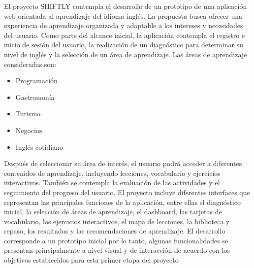 El proyecto SHIFTLY contempla el desarrollo de un prototipo de una
aplicación web orientada al aprendizaje del idioma inglés. La propuesta
busca ofrecer una experiencia de aprendizaje organizada y adaptable a los
intereses y necesidades del usuario. Como parte del alcance inicial, la aplicación contempla el registro e inicio de sesión del usuario, la realización de un diagnóstico para determinar su nivel de inglés y la selección de un área de aprendizaje.
Las áreas de aprendizaje consideradas son:
\begin{itemize}
\item Programación
\item Gastronomía
\item Turismo
\item Negocios
\item Inglés cotidiano
\end{itemize}
Después de seleccionar su área de interés, el usuario podrá acceder a
diferentes contenidos de aprendizaje, incluyendo lecciones, vocabulario y
ejercicios interactivos. También se contempla la evaluación de las
actividades y el seguimiento del progreso del usuario. El proyecto incluye diferentes interfaces que representan las principales funciones de la aplicación, entre ellas el diagnóstico inicial, la selección de áreas de aprendizaje, el dashboard, las tarjetas de
vocabulario, los ejercicios interactivos, el mapa de lecciones, la biblioteca y repaso, los resultados y las recomendaciones de aprendizaje.
El desarrollo corresponde a un prototipo inicial por lo tanto, algunas
funcionalidades se presentan principalmente a nivel visual y de
interacción de acuerdo con los objetivos establecidos para esta primer etapa del
proyecto